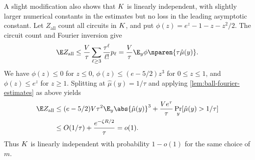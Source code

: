 \begin{remark}
\label{rem:linear-independence}
A slight modification also shows that $K$ is linearly
independent, with slightly larger numerical constants in the
estimates but no loss in the leading asymptotic constant.
Let $Z_{\mathrm{all}}$ count all circuits in $K$, and put
$\phi(z)=e^z-1-z-z^2/2$. The circuit count and Fourier
inversion give
$$
\E Z_{\mathrm{all}}
\le\frac V\tau\sum_{\ell\ge3}\frac{\tau^\ell}{\ell!}p_\ell
=\frac V\tau\E_y\phi\nparen{\tau\hat\mu(y)}.
$$
We have $\phi(z)\le0$ for $z\le0$,
$\phi(z)\le(e-5/2)z^3$ for $0\le z\le1$, and
$\phi(z)\le e^z$ for $z\ge1$. Splitting at
$\hat\mu(y)=1/\tau$ and applying
\autoref{lem:ball-fourier-estimates} as above yields
$$
\begin{aligned}
\E Z_{\mathrm{all}}
&\le(e-5/2)V\tau^2\E_y\abs{\hat\mu(y)}^3
  +\frac{Ve^\tau}{\tau}\Pr_y[\hat\mu(y)>1/\tau]\\
&\le O(1/\tau)+\frac{e^{-\zeta R/2}}{\tau}
=o(1).
\end{aligned}
$$
Thus $K$ is linearly independent with probability $1-o(1)$
for the same choice of $m$.
\end{remark}
